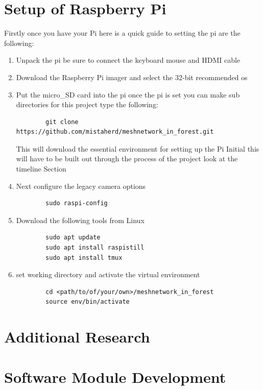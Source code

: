 \section{Setup of Raspberry Pi}
Firstly once you have  your Pi here is a  quick  guide to setting the pi are  the following:
\begin{enumerate}
    \item Unpack the  pi be sure  to  connect the keyboard mouse  and HDMI cable
    \item Download the Raspberry Pi imager and  select the 32-bit recommended os 
    \item Put the  micro\_SD card  into  the pi once the  pi is set you can make sub directories for this project type the  following:
    \begin{verbatim}
        git clone https://github.com/mistaherd/meshnetwork_in_forest.git
    \end{verbatim}
    This  will download the essential environment for  setting up the  Pi Initial this will have to be built out  through the  process of  the   project look at the timeline Section
    \item Next configure the legacy camera  options
    \begin{verbatim}
        sudo raspi-config
    \end{verbatim}
    \item Download the following tools from Linux
    \begin{verbatim}
        sudo apt update
        sudo apt install raspistill
        sudo apt install tmux
    \end{verbatim}
    \item set working directory and activate the virtual environment
    \begin{verbatim}
        cd <path/to/of/your/own>/meshnetwork_in_forest
        source env/bin/activate
    \end{verbatim}
\end{enumerate}
\section{Additional  Research}

\section{Software Module Development}

\newpage

